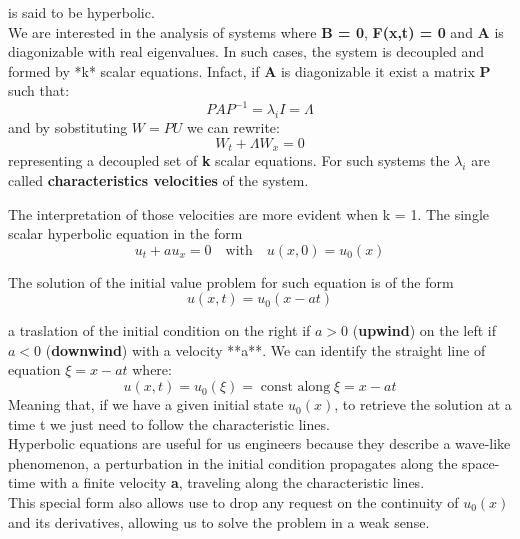 \documentclass{report}
\begin{document}
is said to be hyperbolic. \\

We are interested in the analysis of systems where
\textbf{B = 0}, \textbf{F(x,t) = 0} and \textbf{A} is diagonizable with real eigenvalues. In such cases, the system is decoupled and formed by *k* scalar equations.
Infact, if \textbf{A} is diagonizable it exist a matrix \textbf{P} such that:
\begin{equation*}
    PAP^{-1} = \lambda_iI = \Lambda
\end{equation*}
and by sobstituting $ W = PU$ we can rewrite:
\begin{equation*}
    W_t + \Lambda W_x = 0
\end{equation*}
representing a decoupled set of \textbf{k} scalar equations. For such systems the $\lambda_i$ are called \textbf{characteristics velocities} of the system.

The interpretation of those velocities are more evident when k = 1.
The single scalar hyperbolic equation in the form
\begin{equation*}
    u_t + au_x = 0   \quad \textrm{with} \quad u(x,0) = u_0(x)
\end{equation*}

The solution of the initial value problem for such equation is of the form
\begin{equation*}
    u(x,t) = u_0(x-at)
\end{equation*}

a traslation of the initial condition on the right if $a>0$ (\textbf{upwind}) on the left if $a<0$ (\textbf{downwind}) with a velocity **a**. We can identify the straight line of equation
$ \xi = x - at$ where:
\begin{equation*}
    u(x,t) = u_0(\xi) = \; \textrm{const along} \;\xi = x - at
\end{equation*}
Meaning that, if we have a given initial state $u_0(x)$, to retrieve the solution at a time t we just need to follow the characteristic lines.\\
Hyperbolic equations are useful for us engineers because they describe a wave-like phenomenon, a perturbation in the initial condition
propagates along the space-time with a finite velocity \textbf{a}, traveling along the characteristic lines.\\
This special form also allows use to drop any request on the continuity of $u_0(x)$ and its derivatives, allowing us to solve the problem in a weak sense.
\end{document}
